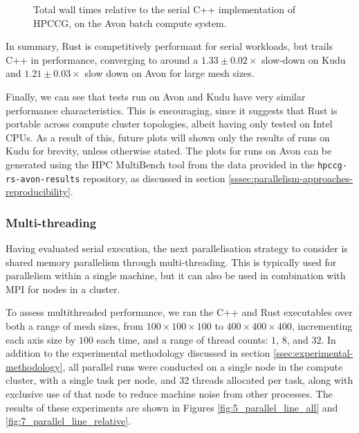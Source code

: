 \begin{figure}[H]
    \centering
    
    \vspace*{-0.5cm}
    \caption{Total wall times relative to the serial C++ implementation of HPCCG, on the Avon batch compute system.}
    \label{fig:2_serial_line_relative_avon}
\end{figure}


In summary, Rust is competitively performant for serial workloads, but trails C++ in performance, converging to around a $1.33 \pm 0.02 \times$ slow-down on Kudu and $1.21 \pm 0.03 \times$ slow down on Avon for large mesh sizes.

Finally, we can see that tests run on Avon and Kudu have very similar performance characteristics. This is encouraging, since it suggests that Rust is portable across compute cluster topologies, albeit having only tested on Intel CPUs. As a result of this, future plots will shown only the results of runs on Kudu for brevity, unless otherwise stated. The plots for runs on Avon can be generated using the HPC MultiBench tool from the data provided in the \texttt{hpccg-rs-avon-results} repository, as discussed in section \ref{sssec:parallelism-approaches-reproducibility}.

\subsubsection{Multi-threading}
\label{sssec:multi-threaded}

Having evaluated serial execution, the next parallelisation strategy to consider is shared memory parallelism through multi-threading. This is typically used for parallelism within a single machine, but it can also be used in combination with MPI for nodes in a cluster.

To assess multithreaded performance, we ran the C++ and Rust executables over both a range of mesh sizes, from $100 \times 100 \times 100$ to $400 \times 400 \times 400$, incrementing each axis size by $100$ each time, and a range of thread counts: $1$, $8$, and $32$. In addition to the experimental methodology discussed in section \ref{ssec:experimental-methodology}, all parallel runs were conducted on a single node in the compute cluster, with a single task per node, and 32 threads allocated per task, along with exclusive use of that node to reduce machine noise from other processes.
The results of these experiments are shown in Figures \ref{fig:5_parallel_line_all} and \ref{fig:7_parallel_line_relative}.

